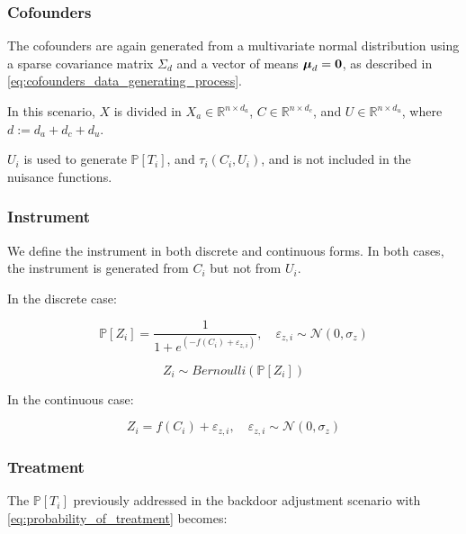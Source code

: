 \documentclass{article}
\numberwithin{equation}{section}
\begin{document}
\subsubsection{Cofounders}

The cofounders are again generated from a multivariate normal distribution using a sparse covariance matrix $\Sigma_d$ and a vector of means $\boldsymbol{\mu}_d = \bf{0}$, as described in \eqref{eq:cofounders_data_generating_process}.

In this scenario, $X$ is divided in $X_a \in \mathbb{R}^{n \times d_a}$, $C \in \mathbb{R}^{n \times d_c}$, and $U \in \mathbb{R}^{n \times d_u}$, where $d := d_a + d_c + d_u$.

$U_i$ is used to generate $\mathbb{P}[T_i]$, and $\tau_i(C_i, U_i)$, and is not included in the nuisance functions.

\subsubsection{Instrument}

We define the instrument in both discrete and continuous forms. In both cases, the instrument is generated from $C_i$ but not from $U_i$.

In the discrete case:

\begin{equation}
    \mathbb{P}[Z_i] = \frac{1}{1 + e^{(-f(C_i) + \varepsilon_{z, i})}}, \quad \varepsilon_{z, i} \sim \mathcal{N}(0, \sigma_z)
    \label{eq:probability_of_instrument}
\end{equation}

\begin{equation}
    Z_i \sim Bernoulli(\mathbb{P}[Z_i])
\end{equation}

In the continuous case:

\begin{equation}
    Z_i = f(C_i) + \varepsilon_{z, i}, \quad \varepsilon_{z, i} \sim \mathcal{N}(0, \sigma_z)
    \label{eq:continuous_instrument}
\end{equation}

\subsubsection{Treatment}

The $\mathbb{P}[T_i]$ previously addressed in the backdoor adjustment scenario with \eqref{eq:probability_of_treatment} becomes:
\end{document}
